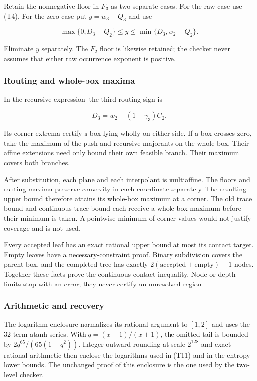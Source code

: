 Retain the nonnegative floor in \(F_3\) as two separate cases. For the raw case use (T4). For the zero case put \(y=w_3-Q_3\) and use

\[
\max\{0,D_3-Q_2\}\le y\le\min\{D_3,w_2-Q_2\}.
\tag{T12}
\]

Eliminate \(y\) separately. The \(F_2\) floor is likewise retained; the checker never assumes that either raw occurrence exponent is positive.

\hypertarget{af-a9ec399514-routing-and-whole-box-maxima}{%
\subsubsection{Routing and whole-box maxima}\label{af-a9ec399514-routing-and-whole-box-maxima}}

In the recursive expression, the third routing sign is

\[
D_3=w_2-(1-\gamma_3)C_2.
\]

Its corner extrema certify a box lying wholly on either side. If a box crosses zero, take the maximum of the push and recursive majorants on the whole box. Their affine extensions need only bound their own feasible branch. Their maximum covers both branches.

After substitution, each plane and each interpolant is multiaffine. The floors and routing maxima preserve convexity in each coordinate separately. The resulting upper bound therefore attains its whole-box maximum at a corner. The old trace bound and continuous trace bound each receive a whole-box maximum before their minimum is taken. A pointwise minimum of corner values would not justify coverage and is not used.

Every accepted leaf has an exact rational upper bound at most its contact target. Empty leaves have a necessary-constraint proof. Binary subdivision covers the parent box, and the completed tree has exactly \(2(\text{accepted}+\text{empty})-1\) nodes. Together these facts prove the continuous contact inequality. Node or depth limits stop with an error; they never certify an unresolved region.

\hypertarget{af-a9ec399514-arithmetic-and-recovery}{%
\subsubsection{Arithmetic and recovery}\label{af-a9ec399514-arithmetic-and-recovery}}

The logarithm enclosure normalizes its rational argument to \([1,2]\) and uses the 32-term atanh series. With \(q=(x-1)/(x+1)\), the omitted tail is bounded by \(2q^{65}/(65(1-q^2))\). Integer outward rounding at scale \(2^{128}\) and exact rational arithmetic then enclose the logarithms used in (T11) and in the entropy lower bounds. The unchanged proof of this enclosure is the one used by the two-level checker.

